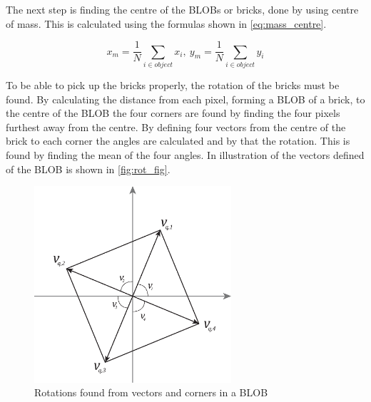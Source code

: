 The next step is finding the centre of the BLOBs or bricks, done by using centre of mass. This is calculated using the formulas shown in \autoref{eq:mass_centre}.

\begin{equation}\label{eq:mass_centre}
	x_m = \frac{1}{N}\sum_{i \in object}x_i, ~y_m= \frac{1}{N}\sum_{i \in object}y_i 
\end{equation}


To be able to pick up the bricks properly, the rotation of the bricks must be found. By calculating the distance from each pixel, forming a BLOB of a brick, to the centre of the BLOB the four corners are found by finding the four pixels furthest away from the centre. By defining four vectors from the centre of the brick to each corner the angles are calculated and by that the rotation. This is found by finding the mean of the four angles. In illustration of the vectors defined of the BLOB is shown in \autoref{fig:rot_fig}.

\begin{figure}[H]
	\centering
	\includegraphics[width=0.65\textwidth]{figures/rot_fig}
	\caption{Rotations found from vectors and corners in a BLOB}
	\label{fig:rot_fig}
\end{figure}
